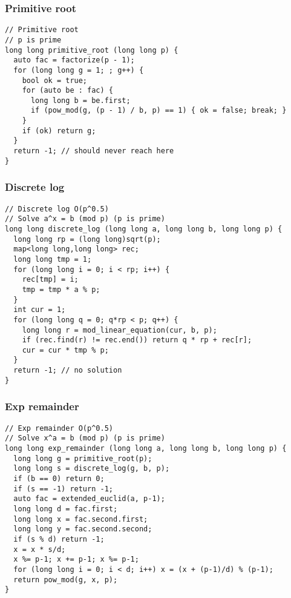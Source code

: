 \documentclass[10pt,landscape]{article}
\begin{document}
\begin{multicols}{2}
\subsubsection{Primitive root}
\begin{lstlisting}
// Primitive root
// p is prime
long long primitive_root (long long p) {
  auto fac = factorize(p - 1);
  for (long long g = 1; ; g++) {
    bool ok = true;
    for (auto be : fac) {
      long long b = be.first;
      if (pow_mod(g, (p - 1) / b, p) == 1) { ok = false; break; }
    }
    if (ok) return g;
  }
  return -1; // should never reach here
}
\end{lstlisting}
\subsubsection{Discrete log}
\begin{lstlisting}
// Discrete log O(p^0.5)
// Solve a^x = b (mod p) (p is prime)
long long discrete_log (long long a, long long b, long long p) {
  long long rp = (long long)sqrt(p);
  map<long long,long long> rec;
  long long tmp = 1;
  for (long long i = 0; i < rp; i++) {
    rec[tmp] = i;
    tmp = tmp * a % p;
  }
  int cur = 1;
  for (long long q = 0; q*rp < p; q++) {
    long long r = mod_linear_equation(cur, b, p);
    if (rec.find(r) != rec.end()) return q * rp + rec[r];
    cur = cur * tmp % p;
  }
  return -1; // no solution
}
\end{lstlisting}
\subsubsection{Exp remainder}
\begin{lstlisting}
// Exp remainder O(p^0.5)
// Solve x^a = b (mod p) (p is prime)
long long exp_remainder (long long a, long long b, long long p) {
  long long g = primitive_root(p);
  long long s = discrete_log(g, b, p);
  if (b == 0) return 0;
  if (s == -1) return -1;
  auto fac = extended_euclid(a, p-1);
  long long d = fac.first;
  long long x = fac.second.first;
  long long y = fac.second.second;
  if (s % d) return -1;
  x = x * s/d;
  x %= p-1; x += p-1; x %= p-1;
  for (long long i = 0; i < d; i++) x = (x + (p-1)/d) % (p-1);
  return pow_mod(g, x, p);
}
\end{lstlisting}

\end{multicols}
\end{document}
